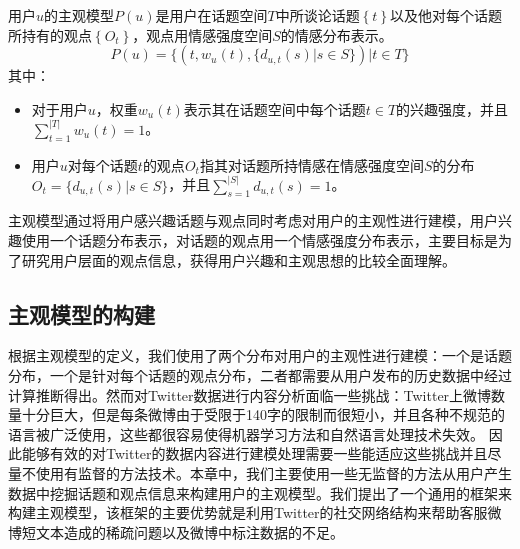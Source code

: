 \begin{landscape}
\begin{definition}[主观模型]
用户$ u $的主观模型$ P \left( u \right) $是用户在话题空间$T$中所谈论话题$\left\lbrace  t \right\rbrace $以及他对每个话题所持有的观点$\left\lbrace O_{t}\right\rbrace $，观点用情感强度空间$ S $的情感分布表示。
\begin{equation}
\label{usermodel}
P \left( u \right) = \lbrace \left( t, w_{u} \left( t \right), \lbrace d_{u,t} \left( s \right)|s \in S \rbrace \right) |  t \in T \rbrace
\end{equation}
其中：
\begin{itemize}
\item 对于用户$ u $，权重$ w_{u} \left( t \right)$表示其在话题空间中每个话题$t \in T$的兴趣强度，并且$ \sum_{t=1}^{|T|}w_{u} \left( t \right)=1 $。
\item 用户$ u $对每个话题$t$的观点$O_{t}$指其对话题所持情感在情感强度空间$ S $的分布$O_{t}=\lbrace d_{u,t} \left( s \right)|s \in S \rbrace $，并且$ \sum_{s=1}^{|S|} d_{u,t} \left( s \right)=1$。
\end{itemize}
\end{definition}

主观模型通过将用户感兴趣话题与观点同时考虑对用户的主观性进行建模，用户兴趣使用一个话题分布表示，对话题的观点用一个情感强度分布表示，主要目标是为了研究用户层面的观点信息，获得用户兴趣和主观思想的比较全面理解。

\subsection{主观模型的构建}
\label{establish}
根据主观模型的定义，我们使用了两个分布对用户的主观性进行建模：一个是话题分布，一个是针对每个话题的观点分布，二者都需要从用户发布的历史数据中经过计算推断得出。然而对Twitter数据进行内容分析面临一些挑战：Twitter上微博数量十分巨大，但是每条微博由于受限于140字的限制而很短小，并且各种不规范的语言被广泛使用，这些都很容易使得机器学习方法和自然语言处理技术失效。
因此能够有效的对Twitter的数据内容进行建模处理需要一些能适应这些挑战并且尽量不使用有监督的方法技术。本章中，我们主要使用一些无监督的方法从用户产生数据中挖掘话题和观点信息来构建用户的主观模型。我们提出了一个通用的框架来构建主观模型，该框架的主要优势就是利用Twitter的社交网络结构来帮助客服微博短文本造成的稀疏问题以及微博中标注数据的不足。


\end{landscape}
